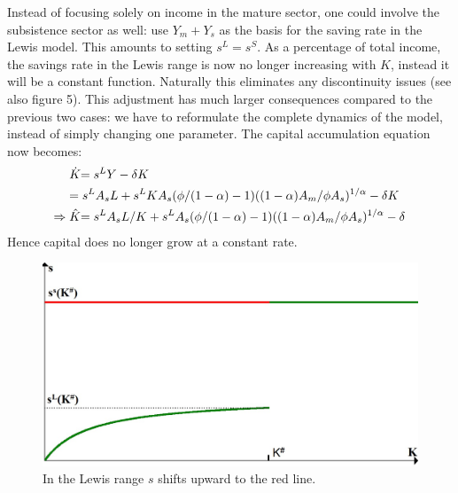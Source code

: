 \documentclass[a4paper]{article}
\begin{document}
Instead of focusing solely on income in the mature sector, one could involve the subsistence sector as well: use $Y_m+Y_s$ as the basis for the saving rate in the Lewis model. This amounts to setting $s^L=s^S$. As a percentage of total income, the savings rate in the Lewis range is now no longer increasing with $K$, instead it will be a constant function. Naturally this eliminates any discontinuity issues (see also figure 5).
This adjustment has much larger consequences compared to the previous two cases: we have to reformulate the complete dynamics of the model, instead of simply changing one parameter. The capital accumulation equation now becomes:
\begin{subequations}
\begin{align}
 &\dot{K} 	\hspace{-0.1cm}=s^LY-{\delta}K\nonumber\\
 &{}		\hspace{-0.1cm}=s^LA_sL+s^LKA_s({\phi}/(1-{\alpha})-1)((1-{\alpha})A_m/{\phi}A_s)^{1/{\alpha}}-{\delta}K\\
 \Rightarrow \hspace{0.1cm} 
 &\hat{K}	\hspace{-0.1cm}=s^LA_sL/K+s^LA_s({\phi}/(1-{\alpha})-1)((1-{\alpha})A_m/{\phi}A_s)^{1/{\alpha}}-{\delta}
\end{align}
\end{subequations}
Hence capital does no longer grow at a constant rate.\\
\begin{figure}[!ht]
\includegraphics[width=\textwidth]{EndoSavings3.jpg}
\caption{In the Lewis range $s$ shifts upward to the red line.}
\end{figure}\\

\newpage
\end{document}

